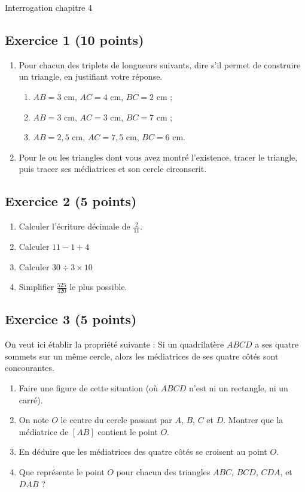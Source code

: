 \documentclass[14 pt]{extarticle}
\theoremstyle{plain}
\begin{document}
\newpage 
\begin{center}{\Large Interrogation chapitre 4}\\ 
 \end{center}
 
 
 \subsection*{Exercice 1 (10 points)} 
 
 \begin{enumerate}
 \item Pour chacun des triplets de longueurs suivants, dire s'il permet de construire un triangle, en justifiant votre réponse.  
\begin{enumerate}
\item $AB = 3$ cm, $AC = 4$ cm, $BC = 2$ cm ;
\item $AB = 3$ cm, $AC = 3$ cm, $BC = 7$ cm ;
\item $AB = 2,5$ cm, $AC = 7,5$ cm, $BC = 6$ cm. 
\end{enumerate}

\item Pour le ou les triangles dont vous avez montré l'existence, tracer le triangle, puis tracer ses médiatrices et son cercle circonscrit. 
\end{enumerate}


\subsection*{Exercice 2 (5 points)}
\begin{enumerate}
\item Calculer l'écriture décimale de $\frac2{11}$. 
\item Calculer $11 - 1 +4$
\item Calculer $30 \div 3\times 10$
\item Simplifier $\frac{525}{420}$ le plus possible. 
\end{enumerate}


\subsection*{Exercice 3 (5 points)}
On veut ici établir la propriété suivante : \og Si un quadrilatère $ABCD$ a ses quatre sommets sur un même cercle, alors les médiatrices de ses quatre côtés sont concourantes.\fg
\begin{enumerate}
\item Faire une figure de cette situation (où $ABCD$ n'est ni un rectangle, ni un carré).
\item On note $O$ le centre du cercle passant par $A$, $B$, $C$ et $D$. Montrer que la médiatrice de $[AB]$ contient le point $O$. 
\item En déduire que les médiatrices des quatre côtés se croisent au point $O$. 
\item Que représente le point $O$ pour chacun des triangles $ABC$, $BCD$, $CDA$, et $DAB$ ?
\end{enumerate}

 	
\end{document}
